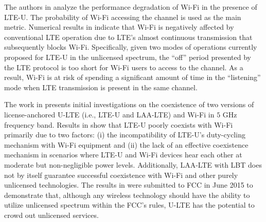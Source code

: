 The authors in \cite{LTE-U-PIMRC-2014} analyze the performance degradation of Wi-Fi in the presence of LTE-U. The probability of Wi-Fi accessing the channel is used as the main metric. Numerical results in \cite{LTE-U-PIMRC-2014} indicate that Wi-Fi is negatively affected by conventional LTE operation due to LTE's almost continuous transmission that subsequently blocks Wi-Fi. Specifically, given two modes of operations currently proposed for LTE-U in the unlicensed spectrum, the ``off'' period presented by the LTE protocol is too short for Wi-Fi users to access to the channel. As a result, Wi-Fi is at risk of spending a significant amount of time in the ``listening'' mode when LTE transmission is present in the same channel.

The work in \cite{U-LTE-Google-WP} presents initial investigations on the coexistence of two versions of license-anchored U-LTE (i.e., LTE-U and LAA-LTE) and Wi-Fi in $5$ GHz frequency band. Results in \cite{U-LTE-Google-WP} show that LTE-U poorly coexists with Wi-Fi primarily due to two factors: (i) the incompatibility of LTE-U's duty-cycling mechanism with Wi-Fi equipment and (ii) the lack of an effective coexistence mechanism in scenarios where LTE-U and Wi-Fi devices hear each other at moderate but non-negligible power levels. Additionally, LAA-LTE with LBT does not by itself guarantee successful coexistence with Wi-Fi and other purely unlicensed technologies. The results in \cite{U-LTE-Google-WP} were submitted to FCC in June 2015 to demonstrate that, although any wireless technology should have the ability to utilize unlicensed spectrum within the FCC's rules, U-LTE has the potential to crowd out unlicensed services.

